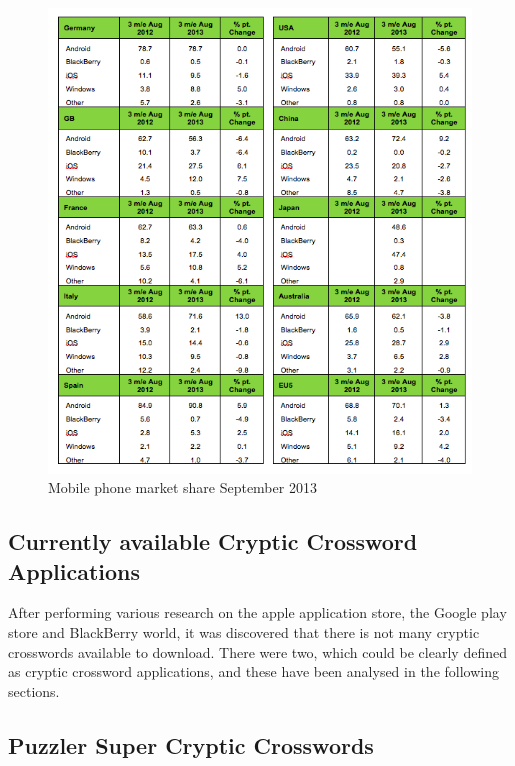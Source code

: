 \newpage
\begin{figure}[H]
  \centering
  \includegraphics[scale=0.75]{forbeslist13.png}
  \caption{Mobile phone market share September 2013}
\end{figure}

\begin{flushright}
\citep{forbes13}
\end{flushright}

\subsection{Currently available Cryptic Crossword Applications}

After performing various research on the apple application store, the Google
play store and BlackBerry world, it was discovered that there is not many
cryptic crosswords available to download. There were two, which could be clearly
defined as cryptic crossword applications, and these have been analysed in the
following sections.

\subsection{Puzzler Super Cryptic Crosswords}

